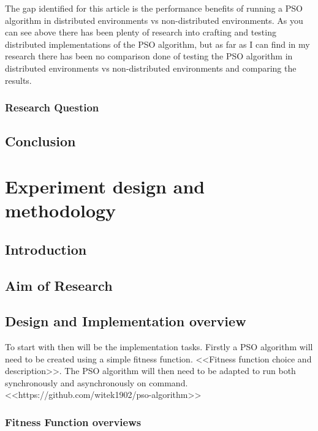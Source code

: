 \documentclass[oneside,12pt]{book}
\begin{document}
The gap identified for this article is the performance benefits of running a PSO algorithm in distributed environments vs non-distributed environments. As you can see above there has been plenty of research into crafting and testing distributed implementations of the PSO algorithm, but as far as I can find in my research there has been no comparison done of testing the PSO algorithm in distributed environments vs non-distributed environments and comparing the results.

\subsection{Research Question}

\section{Conclusion}


\chapter{Experiment design and methodology}
\section{Introduction}
\section{Aim of Research}
\section{Design and Implementation overview}
To start with then will be the implementation tasks. Firstly a PSO algorithm will need to be created using a simple fitness function. <<Fitness function choice and description>>. The PSO algorithm will then need to be adapted to run both synchronously and asynchronously on command.
<<https://github.com/witek1902/pso-algorithm>>

\subsection{Fitness Function overviews}
\end{document}
